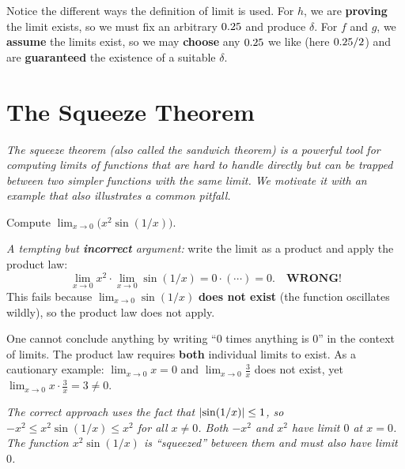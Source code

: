 \begin{remark}
Notice the different ways the definition of limit is used.  For $h$, we are \textbf{proving} the limit exists, so we must fix an arbitrary $0.25$ and produce $\delta$.  For $f$ and $g$, we \textbf{assume} the limits exist, so we may \textbf{choose} any $0.25$ we like (here $0.25/2$) and are \textbf{guaranteed} the existence of a suitable $\delta$.
\end{remark}

\section{The Squeeze Theorem}
\label{sec:2.12}

\textit{The squeeze theorem (also called the sandwich theorem) is a powerful tool for computing limits of functions that are hard to handle directly but can be trapped between two simpler functions with the same limit.  We motivate it with an example that also illustrates a common pitfall.}

\begin{example}
\label{ex:2-8}
Compute $\lim_{x \to 0} \bigl(x^{2} \sin(1/x)\bigr)$.

\textit{A tempting but \textbf{incorrect} argument:} write the limit as a product and apply the product law:
\[
  \lim_{x \to 0} x^{2} \cdot \lim_{x \to 0} \sin(1/x) = 0 \cdot (\cdots) = 0. \quad \textbf{WRONG!}
\]
This fails because $\lim_{x \to 0} \sin(1/x)$ \textbf{does not exist} (the function oscillates wildly), so the product law does not apply.
\end{example}

\begin{remark}[Warning]
One cannot conclude anything by writing ``$0$ times anything is $0$'' in the context of limits.  The product law requires \textbf{both} individual limits to exist.  As a cautionary example: $\lim_{x \to 0} x = 0$ and $\lim_{x \to 0} \frac{3}{x}$ does not exist, yet $\lim_{x \to 0} x \cdot \frac{3}{x} = 3 \neq 0$.
\end{remark}

\textit{The correct approach uses the fact that $\left\lvert \sin(1/x) \right\rvert \leq 1$, so $-x^{2} \leq x^{2}\sin(1/x) \leq x^{2}$ for all $x \neq 0$.  Both $-x^{2}$ and $x^{2}$ have limit $0$ at $x = 0$.  The function $x^{2}\sin(1/x)$ is ``squeezed'' between them and must also have limit $0$.}

